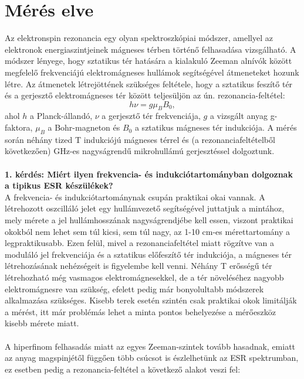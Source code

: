 \documentclass[12pt,a4paper]{article}
\begin{document}
\section{Mérés elve}
\hspace*{10pt} Az elektronspin rezonancia egy olyan spektroszkópiai módszer, amellyel az elektronok energiaszintjeinek mágneses térben történő felhasadása vizsgálható. A módszer lényege, hogy sztatikus tér hatására a kialakuló Zeeman alnívók között megfelelő frekvenciájú elektromágneses hullámok segítségével átmeneteket hozunk létre. Az átmenetek létrejöttének szükséges feltétele, hogy a sztatikus feszítő tér és a gerjesztő elektromágneses tér között teljesüljön az ún. rezonancia-feltétel:
\begin{equation}
h\nu=g\mu_{B}B_0,
\end{equation}
ahol $h$ a Planck-állandó, $\nu$ a gerjesztő tér frekvenciája, $g$ a vizsgált anyag g-faktora, $\mu_{B}$ a Bohr-magneton és $B_{0}$ a sztatikus mágneses tér indukciója. A mérés során néhány tized T indukciójú mágneses térrel és (a rezonanciafeltételből következően) GHz-es nagyságrendű mikrohullámú gerjesztéssel dolgoztunk.\\
\\
\textbf{1. kérdés: Miért ilyen frekvencia- és indukciótartományban dolgoznak a tipikus ESR készülékek?}\\
\hspace*{10pt} A frekvencia- és indukciótartománynak csupán praktikai okai vannak. A létrehozott oszcilláló jelet egy hullámvezető segítségével juttatjuk a mintához, mely mérete a jel hullámhosszának nagyságrendjébe kell essen, viszont praktikai okokból nem lehet sem túl kicsi, sem túl nagy, az 1-10 cm-es mérettartomány a legpraktikusabb. Ezen felül, mivel a rezonanciafeltétel miatt rögzítve van a moduláló jel frekvenciája és a sztatikus előfeszítő tér indukciója, a mágneses tér létrehozásának nehézségeit is figyelembe kell venni. Néhány T erősségű tér létrehozható még vasmagos elektromágnesekkel, de a tér növeléséhez nagyobb elektromágnesre van szükség, efelett pedig már bonyolultabb módszerek alkalmazása szükséges. Kisebb terek esetén szintén csak praktikai okok limitálják a mérést, itt már problémás lehet a minta pontos behelyezése a mérőeszköz kisebb mérete miatt.\\
\\
\hspace*{10pt}  A hiperfinom felhasadás miatt az egyes Zeeman-szintek tovább hasadnak, emiatt az anyag magspinjétől függően több csúcsot is észlelhetünk az ESR spektrumban, ez esetben pedig a rezonancia-feltétel a következő alakot veszi fel:
\end{document}
